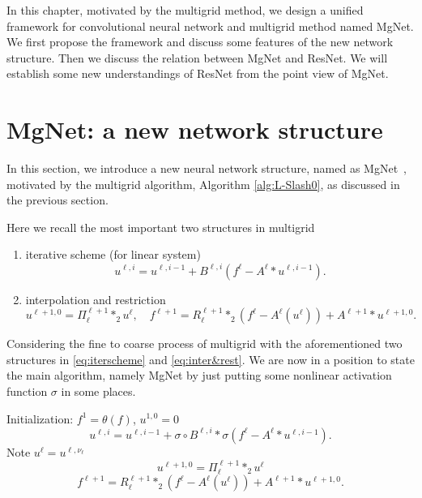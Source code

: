 In this chapter, motivated by the multigrid method, 
we design a unified framework for convolutional neural network 
and multigrid method named MgNet. 
We first propose the framework and discuss some features of the new network structure. 
Then we discuss the relation between MgNet and ResNet. We will establish some new understandings 
of ResNet from the point view of MgNet. 

\section{MgNet: a new network structure}\label{sec:mgnet}
In this section, we introduce a new neural network structure,
named as MgNet~\cite{he2019mgnet}, motivated by the multigrid algorithm, 
Algorithm \ref{alg:L-Slash0},
as discussed in the previous section.

Here we recall the most important two structures in multigrid
\begin{enumerate}
	\item iterative scheme (for linear system)
	\begin{equation}\label{eq:iterscheme}
	u^{\ell,i} = u^{\ell,i-1} + B^{\ell,i} ({f^\ell -  A^{\ell} \ast u^{\ell,i-1}}).
	\end{equation}
	\item interpolation and restriction
	\begin{equation}\label{eq:inter&rest}
	u^{\ell+1,0} = \Pi_\ell^{\ell+1} \ast_2 u^{\ell},  \quad 	f^{\ell+1} = R^{\ell+1}_\ell \ast_2 (f^\ell - A^\ell(u^{\ell})) + A^{\ell+1} \ast u^{\ell+1,0}.
	\end{equation}
\end{enumerate}

Considering the fine to coarse process of multigrid with the aforementioned
two structures in \eqref{eq:iterscheme} and \eqref{eq:inter&rest}.
We are now in a position to state the main algorithm, namely
MgNet by just putting some nonlinear activation function $\sigma$ in some places.
\begin{breakablealgorithm}
	\caption{$u^{J}={\rm MgNet}(f; J,\nu_1, \cdots, \nu_J)$}
	\label{alg:mgnet}
	\begin{algorithmic}
		\State Initialization:  $f^1 = \theta(f)$, $u^{1,0} = 0$
		\State 
		\begin{equation}\label{mgnet}
		u^{\ell,i} = u^{\ell,i-1} + \sigma \circ B^{\ell,i} \ast \sigma ({f^\ell -  A^{\ell} \ast u^{\ell,i-1}}).
		\end{equation}
		\EndFor
		\State Note $u^\ell = u^{\ell,\nu_\ell}$
		\begin{equation}
		\label{interpolation}
		u^{\ell+1,0} = \Pi_\ell^{\ell+1} \ast_2 u^{\ell}
		\end{equation}
		\begin{equation}
		\label{restrict-f}
		f^{\ell+1} = R^{\ell+1}_\ell \ast_2 (f^\ell - A^\ell(u^{\ell})) + A^{\ell+1} \ast u^{\ell+1,0}.
		\end{equation}
		\EndFor
	\end{algorithmic}
\end{breakablealgorithm}


